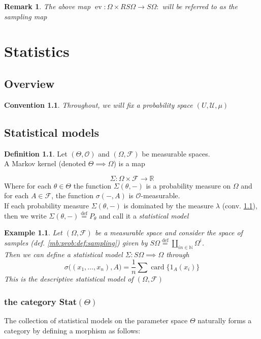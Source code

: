 \documentclass{book}
\theoremstyle{plain}
\newtheorem{convention}[corollary]{Convention}
\newtheorem{example}[corollary]{Example}
\newtheorem{remark}[corollary]{Remark}
\theoremstyle{definition}
\newtheorem{definition}[corollary]{Definition}
\DeclareMathOperator{\card}{card}
\renewcommand{\d}[1]{\mathbb{#1}}
\newcommand{\define}{\stackrel{\operatorname{def}}{=}}
\DeclareMathOperator{\ev}{ev}
\newcommand{\mor}{\longrightarrow}
\renewcommand{\r}[1]{\mathcal{#1}}
\begin{document}
\begin{remark}\label{rem:prob_sampling-map}
The above map $\ev: \Omega\times RS\Omega\mor S\Omega: $
will be referred to as the sampling map
\end{remark}


\chapter{Statistics}


\section{Overview}
\begin{convention}\label{conv:stats_univ-prob}
Throughout, we will fix a probability space $(U,\r{U},\mu)$
\end{convention}
\section{Statistical models}
\begin{definition}
Let $(\Theta, \r{O})$ and $(\Omega,\r{F})$ be measurable spaces.\\
A Markov kernel (denoted $\Theta\implies \Omega$) is a map

\[
\Sigma: \Omega \times \r{F}\mor \d{R}
\]
Where for each $\theta \in \Theta$ the function $\Sigma(\theta,-)$ is a probability measure on $\Omega$ and for each $A \in\r{F}$, the function $\sigma(-,A)$ is $\r{O}$-measurable.\\
If each probability measure $\Sigma(\theta,-)$ is dominated by the measure $\lambda$ (conv. \ref{conv:stats_univ-prob}), then we write $\Sigma(\theta,-)\define P_\theta$ and call it a \emph{statistical model}
\end{definition}

\begin{example}
Let $(\Omega, \r{F})$ be a measurable space and consider the  space  of samples (def. \ref{mb:prob:def:sampling}) given by $S\Omega\define \coprod_{in \in\d{N}}\Omega^i$.\\
Then we can define a statistical model $\Sigma: S\Omega \implies \Omega$ through
\[
\sigma\big((x_1,\ldots, x_n), A\big)=\frac{1}{n}\sum \card\big\{1_{A}(x_i)\big\}
\]
This is the descriptive statistical model of $(\Omega, \r{F})$\end{example}
\subsection{the category Stat$(\Theta)$}
The collection of statistical models on  the parameter space $\Theta$ naturally forms a category by defining a morphism as follows:
\end{document}
